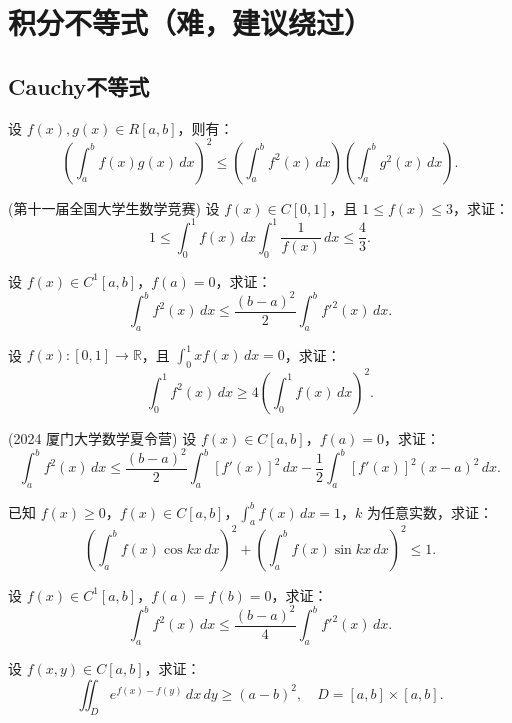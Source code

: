 \documentclass[lang=cn,10pt,thmcnt=section]{elegantbook}
\begin{document}
\section{积分不等式（难，建议绕过）}
\subsection{Cauchy不等式}
\begin{example}[Cauchy不等式]
	设 \( f(x), g(x) \in R[a, b] \)，则有：
\[
\left( \int_a^b f(x) g(x) \, dx \right)^2 \leq \left( \int_a^b f^2(x) \, dx \right) \left( \int_a^b g^2(x) \, dx \right).
\]
\end{example}
\begin{example}
	(第十一届全国大学生数学竞赛) 设 \( f(x) \in C[0,1] \)，且 \( 1 \leq f(x) \leq 3 \)，求证：
\[
1 \leq \int_0^1 f(x) \, dx \int_0^1 \frac{1}{f(x)} \, dx \leq \frac{4}{3}.
\]
\end{example}
\begin{example}
	设 \( f(x) \in C^1[a, b] \)，\( f(a) = 0 \)，求证：
\[
\int_a^b f^2(x) \, dx \leq \frac{(b - a)^2}{2} \int_a^b f'^2(x) \, dx.
\]
\end{example}
\begin{example}
	设 \( f(x): [0,1] \to \mathbb{R} \)，且 \(\int_0^1 x f(x) \, dx = 0\)，求证：
\[
\int_0^1 f^2(x) \, dx \geq 4 \left( \int_0^1 f(x) \, dx \right)^2.
\]
\end{example}
\begin{example}
	(2024 厦门大学数学夏令营) 设 \( f(x) \in C[a, b] \)，\( f(a) = 0 \)，求证：
\[
\int_a^b f^2(x) \, dx \leq \frac{(b - a)^2}{2} \int_a^b [f'(x)]^2 \, dx - \frac{1}{2} \int_a^b [f'(x)]^2 (x - a)^2 \, dx.
\]
\end{example}
\begin{example}
	已知 \( f(x) \geq 0 \)，\( f(x) \in C[a, b] \)，\(\int_a^b f(x) \, dx = 1\)，\( k \) 为任意实数，求证：
    \[
    \left( \int_a^b f(x) \cos kx \, dx \right)^2 + \left( \int_a^b f(x) \sin kx \, dx \right)^2 \leq 1.
    \]
\end{example}
\begin{example}
	设 \( f(x) \in C^1[a, b] \)，\( f(a) = f(b) = 0 \)，求证：
    \[
    \int_a^b f^2(x) \, dx \leq \frac{(b - a)^2}{4} \int_a^b f'^2(x) \, dx.
    \]
\end{example}
\begin{example}
	设 \( f(x, y) \in C[a, b] \)，求证：
    \[
    \iint_{D} e^{f(x) - f(y)} \, dx \, dy \geq (a - b)^2, \quad D = [a, b] \times [a, b].
    \]
\end{example}
\end{document}
